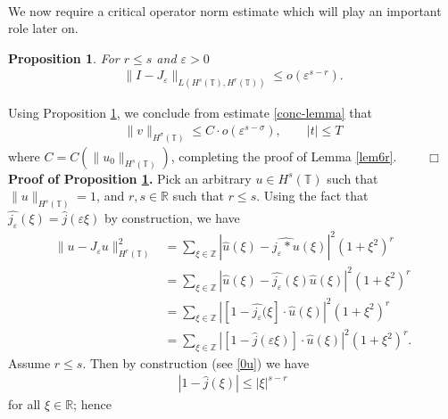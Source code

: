 \documentclass[12pt,reqno]{amsart}
\newcommand{\rr}{\mathbb{R}}
\newcommand{\zz}{\mathbb{Z}}
\newcommand{\ci}{\mathbb{T}}
\newcommand{\ee}{\varepsilon}
\theoremstyle{plain}  %
\newtheorem{proposition}{Proposition}
\theoremstyle{definition}
\begin{document}
\begin{appendices}
\begin{equation}
\begin{split}
	\end{split}
\end{equation}
We now require a critical operator norm estimate which will play an
important role later on.
\begin{proposition}
	\label{lem4r}
	For $r \le s$ and $\ee>0$
	\begin{equation}
	\label{0r}
		\begin{split}
			\|I - J_\ee\|_{L(H^s(\ci), H^r(\ci))} \le o(\ee^{s-r}).
		\end{split}
	\end{equation}
\end{proposition}
Using Proposition \ref{lem4r}, we conclude from estimate \eqref{conc-lemma} that
\begin{equation*}
	\begin{split}
		\|v\|_{H^{\sigma}(\ci)} \le C \cdot o(\ee^{s - \sigma}), \qquad |t|
		\le T
	\end{split}
\end{equation*}
where $C=C(\|u_0\|_{H^s(\ci)})$, completing the proof of Lemma \ref{lem6r}.
$\qquad \Box$
%
\vskip0.1in
{\bf Proof of Proposition \ref{lem4r}.}
Pick an arbitrary $u \in H^s(\ci)$ such that $\|u\|_{H^s(\ci)} = 1$, and $r, s \in \rr$ such that $r \le s$. Using the fact that
$\widehat{j_\ee}(\xi) = \widehat{j}(\ee \xi)$ by construction, we have 
\begin{equation}
	\begin{split}
		\|u - J_\ee u\|_{H^r(\ci)}^2 
		& = \sum_{\xi \in \zz} |\widehat{u}(\xi) - \widehat{j_\ee * u}(\xi) |^2
		(1+\xi^2)^r
		\\
		& = \sum_{\xi \in \zz} |\widehat{u}(\xi) - \widehat{j_\ee}(\xi)
		\widehat{u}(\xi) |^2 (1+\xi^2)^r
		\\
		& = \sum_{\xi \in \zz} | [1- \widehat{j_\ee}(\xi] \cdot \widehat{u}(\xi) |^2
		(1+\xi^2)^r
		\\
		& = \sum_{\xi \in \zz} | [1- \widehat{j}(\ee \xi)] \cdot \widehat{u}(\xi) |^2
		(1+\xi^2)^r.
		\label{1r}
	\end{split}
\end{equation}
Assume $r \le s$. Then by construction (see \ref{0u}) we have
\begin{equation*}
	\begin{split}
		|1 - \widehat{j } (\xi) | \le |\xi|^{s-r}
	\end{split}
\end{equation*}
for all $\xi \in \rr$; hence
\begin{equation}
	\begin{split}

\end{split}
\end{equation}
\end{appendices}
\end{document}
